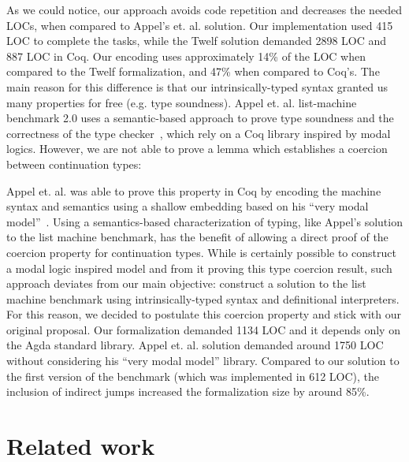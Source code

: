 \documentclass[review]{elsarticle}
\theoremstyle{definition}
\def\resethooks{%
  \global\let\SaveRestoreHook\empty
  \global\let\ColumnHook\empty}
\let\hspre\empty
\let\hspost\empty
\newcommand{\D}[1]{\blue{\mathsf{#1}}}
\newcommand{\F}[1]{\green{\mathsf{#1}}}
\newcommand{\V}[1]{\purple{\mathit{#1}}}
\begin{document}
As we could notice, our approach avoids code repetition and decreases the needed LOCs, when compared to Appel's et. al.
\cite{Appel07} solution.
Our implementation used 415 LOC to complete the tasks, while the Twelf solution demanded 2898 LOC and 887 LOC in Coq.
Our encoding uses approximately 14\% of the LOC when compared to the Twelf formalization, and 47\% when compared to Coq's. The main
reason for this difference is that our intrinsically-typed syntax granted us many properties for free (e.g. type soundness).
Appel et. al. list-machine benchmark 2.0 uses a semantic-based approach to prove type soundness and the
correctness of the type checker~\cite{AppelMRV07}, which rely on a Coq library inspired by modal logics.
However, we are not able to prove a lemma which establishes a coercion between continuation types:
\resethooks
Appel et. al. was able to prove this property in Coq by encoding the machine syntax and semantics using
a shallow embedding based on his ``very modal model''~\cite{Appel07}. Using a semantics-based characterization
of typing, like Appel's solution to the list machine benchmark, has the benefit of allowing a direct proof
of the coercion property for continuation types. While is certainly possible to construct a modal logic
inspired model and from it proving this type coercion result, such approach deviates from our main objective:
construct a solution to the list machine benchmark using intrinsically-typed syntax and definitional interpreters.
For this reason, we decided to postulate this coercion property and stick with our original proposal.
Our formalization demanded 1134 LOC and it depends only on the Agda standard library. Appel et. al.
solution demanded around 1750 LOC without considering his ``very modal model'' library.
Compared to our solution to the first version of the benchmark (which was implemented in 612 LOC),
the inclusion of indirect jumps increased the formalization size by around 85\%.

\section{Related work}\label{sec:related}
\end{document}
